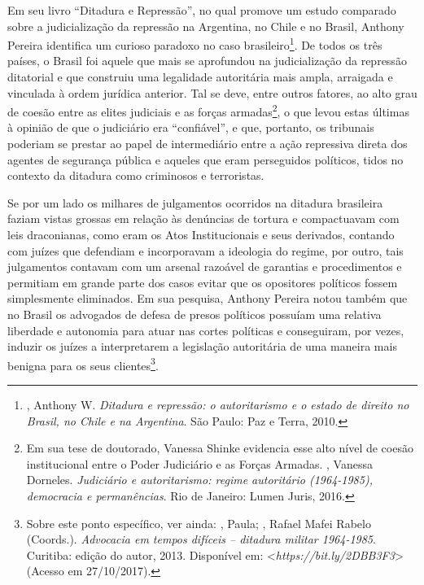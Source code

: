 Em seu livro ``Ditadura e Repressão'', no qual promove um estudo
comparado sobre a judicialização da repressão na Argentina, no Chile e
no Brasil, Anthony Pereira identifica um curioso paradoxo no caso
brasileiro\footnote{, Anthony W. \emph{Ditadura e repressão: o
  autoritarismo e o estado de direito no Brasil, no Chile e na
  Argentina}. São Paulo: Paz e Terra, 2010.}. De todos os três países, o
Brasil foi aquele que mais se aprofundou na judicialização da repressão
ditatorial e que construiu uma legalidade autoritária mais ampla,
arraigada e vinculada à ordem jurídica anterior. Tal se deve, entre
outros fatores, ao alto grau de coesão entre as elites judiciais e as
forças armadas\footnote{Em sua tese de doutorado, Vanessa Shinke
  evidencia esse alto nível de coesão institucional entre o Poder
  Judiciário e as Forças Armadas. , Vanessa Dorneles.
  \emph{Judiciário e autoritarismo: regime autoritário (1964-1985),
  democracia e permanências}. Rio de Janeiro: Lumen Juris, 2016.}, o que
levou estas últimas à opinião de que o judiciário era ``confiável'', e
que, portanto, os tribunais poderiam se prestar ao papel de intermediário
entre a ação repressiva direta dos agentes de segurança pública e
aqueles que eram perseguidos políticos, tidos no contexto da ditadura
como criminosos e terroristas.

Se por um lado os milhares de julgamentos ocorridos na ditadura
brasileira faziam vistas grossas em relação às denúncias de tortura e
compactuavam com leis draconianas, como eram os Atos Institucionais e
seus derivados, contando com juízes que defendiam e incorporavam a
ideologia do regime, por outro, tais julgamentos contavam com um arsenal
razoável de garantias e procedimentos e permitiam em grande parte dos
casos evitar que os opositores políticos fossem simplesmente eliminados.
Em sua pesquisa, Anthony Pereira notou também que no Brasil os advogados
de defesa de presos políticos possuíam uma relativa liberdade e
autonomia para atuar nas cortes políticas e conseguiram, por vezes,
induzir os juízes a interpretarem a legislação autoritária de uma
maneira mais benigna para os seus clientes\footnote{Sobre este ponto
  específico, ver ainda: , Paula; , Rafael Mafei Rabelo
  (Coords.). \emph{Advocacia em tempos difíceis -- ditadura militar
  1964-1985}. Curitiba: edição do autor, 2013. Disponível em:
 \textless{}\emph{https://bit.ly/2DBB3F3}\textgreater{}
  (Acesso em 27/10/2017).}.

